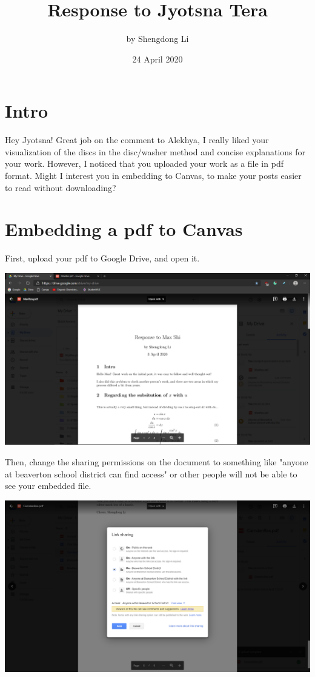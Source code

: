 \documentclass[letterpaper, 12pt]{article}
\begin{document}
\title{Response to Jyotsna Tera}
\author{by Shengdong Li}
\date{24 April 2020}
\maketitle

\section{Intro}
Hey Jyotsna! Great job on the comment to Alekhya, I really liked your visualization of the discs in the disc/washer method and concise explanations for your work. However, I noticed that you uploaded your work as a file in pdf format. Might I interest you in embedding to Canvas, to make your posts easier to read without downloading?
\section{Embedding a pdf to Canvas}
First, upload your pdf to Google Drive, and open it.
\begin{center}
    \includegraphics[scale=0.3]{1.png}
\end{center}
Then, change the sharing permissions on the document to something like "anyone at beaverton school district can find access" or other people will not be able to see your embedded file.
\begin{center}
    \includegraphics[scale=0.3]{9.png}
\end{center}
\end{document}
